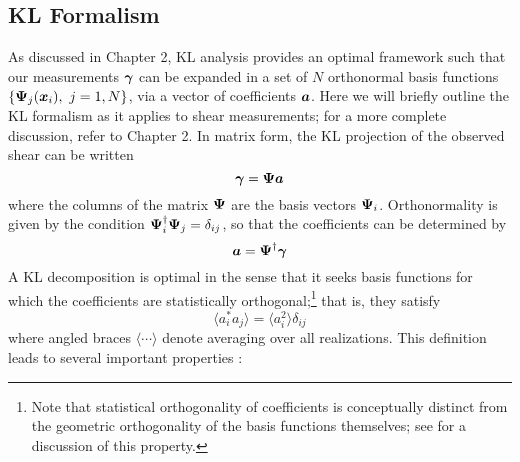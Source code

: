 \subsection{KL Formalism}
\label{KL_Formalism}
As discussed in Chapter 2, KL analysis provides an optimal framework
such that our measurements $\boldsymbol{\gamma}$ 
can be expanded in a set of $N$ orthonormal basis functions 
$\left\{ \boldsymbol{\Psi}_j(\boldsymbol{x}_i),\ j=1,N\right\}$, via a vector of
coefficients $\boldsymbol{a}$.  Here we will briefly outline the KL formalism
as it applies to shear measurements; for a more complete discussion,
refer to Chapter 2.
In matrix form, the KL projection of the observed shear can be written
\begin{equation}
  \boldsymbol{\gamma} = \boldsymbol{\Psi}\boldsymbol{a}
\end{equation}
where the columns of the matrix $\boldsymbol{\Psi}$ are the basis vectors 
$\boldsymbol{\Psi}_i$.  Orthonormality is given by the condition 
$\boldsymbol{\Psi}_i^\dagger\boldsymbol{\Psi}_j = \delta_{ij}$, so that the coefficients
can be determined by
\begin{equation}
  \boldsymbol{a} = \boldsymbol{\Psi}^\dagger\boldsymbol{\gamma}
\end{equation}
A KL decomposition is optimal in the sense that it seeks basis 
functions for which the 
coefficients are statistically orthogonal;\footnote{Note that statistical
orthogonality of coefficients is conceptually distinct from the 
geometric orthogonality of the basis functions themselves; 
see \citet{Vogeley96} for a discussion of this property.}
that is, they satisfy
\begin{equation}
  \langle a_i^* a_j \rangle = \langle a_i^2 \rangle \delta_{ij}
\end{equation}
where angled braces $\langle\cdots\rangle$ denote averaging over all 
realizations.  This definition leads to several important properties
\citep[see][for a thorough discussion \& derivation]{Vogeley96}:
